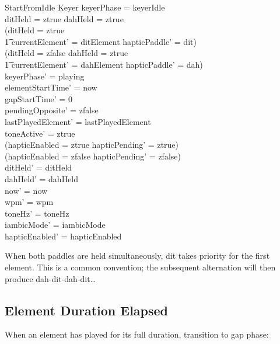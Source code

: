 \documentclass[a4paper,10pt,fleqn]{article}
\begin{document}
\begin{schema}{StartFromIdle}
\Delta Keyer
\where
keyerPhase = keyerIdle \\
ditHeld = ztrue \lor dahHeld = ztrue \\
(ditHeld = ztrue \implies \\
\t1 currentElement' = ditElement \land hapticPaddle' = dit) \\
(ditHeld = zfalse \land dahHeld = ztrue \implies \\
\t1 currentElement' = dahElement \land hapticPaddle' = dah) \\
keyerPhase' = playing \\
elementStartTime' = now \\
gapStartTime' = 0 \\
pendingOpposite' = zfalse \\
lastPlayedElement' = lastPlayedElement \\
toneActive' = ztrue \\
(hapticEnabled = ztrue \implies hapticPending' = ztrue) \\
(hapticEnabled = zfalse \implies hapticPending' = zfalse) \\
ditHeld' = ditHeld \\
dahHeld' = dahHeld \\
now' = now \\
wpm' = wpm \\
toneHz' = toneHz \\
iambicMode' = iambicMode \\
hapticEnabled' = hapticEnabled
\end{schema}

When both paddles are held simultaneously, dit takes priority for the first
element. This is a common convention; the subsequent alternation will then
produce dah-dit-dah-dit\ldots

\subsection{Element Duration Elapsed}

When an element has played for its full duration, transition to gap phase:
\end{document}
